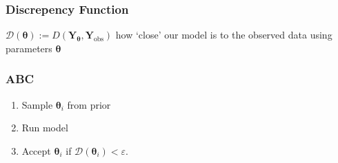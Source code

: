 \documentclass{beamer}
\begin{document}
\begin{frame}
    \frametitle{Discrepency Function}

    $\mathcal{D}(\bm{\theta})
        := D(\mathbf{Y}_{\bm{\theta}}, \mathbf{Y}_\text{obs})$ how `close' our
    model is to the observed data using parameters $\bm{\theta}$

\end{frame}

\begin{frame}
    \frametitle{ABC}
    \begin{enumerate}
        \item Sample $\bm{\theta}_i$ from prior
        \item Run model
        \item Accept $\bm{\theta}_i$ if $\mathcal{D}(\bm{\theta}_i) < \varepsilon.$
    \end{enumerate}
\end{frame}






\end{document}
